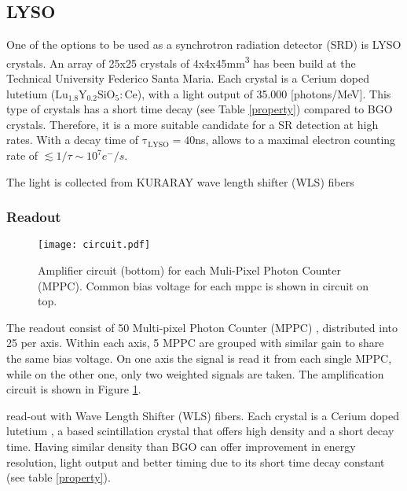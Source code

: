 \subsection{LYSO}

One of the options to be used as a synchrotron radiation detector (SRD) is LYSO crystals\cite{lysogobain}.
An array of 25x25 crystals of 4x4x45\si{\cubic\milli\metre} has been build at the Technical University Federico Santa
Maria. Each crystal is a Cerium doped lutetium ($\mathrm{Lu_{1.8}Y_{0.2}SiO_5:Ce}$), with a light output of 35.000
[photons/MeV]. This type of crystals has a short time decay (see Table \ref{property}) compared to BGO crystals.
Therefore, it is a more suitable candidate for a SR detection at high rates. With a decay time of
$\mathrm{\tau_{LYSO}=40}$ns, allows to a maximal electron counting rate of $\lesssim 1/\tau \sim 10^7 e^-/s$.\par

The light is collected from KURARAY wave length shifter (WLS) fibers 

\subsubsection{Readout}
\begin{figure}[t]
	\hspace*{\fill}
	\centering
	\texttt{[image: circuit.pdf]}
	\hspace*{\fill}
	\caption{Amplifier circuit (bottom) for each Muli-Pixel Photon Counter (MPPC). Common bias voltage for each
	mppc is shown in circuit on top.}\label{scheme}
\end{figure}

The readout consist of 50 Multi-pixel Photon Counter (MPPC) \cite{mppc}, distributed into 25 per axis. Within
each axis, 5 MPPC are grouped with similar gain to share the same bias voltage. On one axis the signal is read it from
each single MPPC, while on the other one, only two weighted signals are taken. The amplification circuit is shown in
Figure \ref{scheme}.


read-out with Wave Length Shifter (WLS) fibers. Each crystal is a Cerium doped lutetium
, a
based scintillation crystal that offers high density and a short decay time. Having similar density than BGO can offer
improvement in energy resolution, light output and better timing due to its short time decay constant (see
table \ref{property}).

